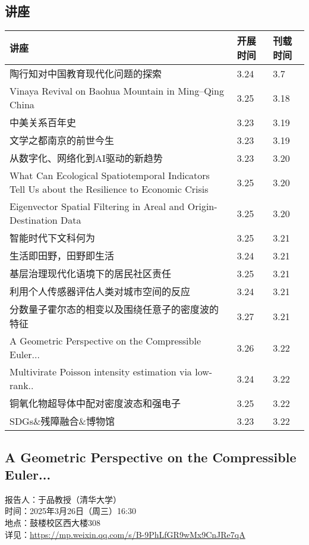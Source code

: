 \documentclass[letterpaper, 12pt]{article}
\begin{document}
\begin{multicols}{2}
\pagebreak

\section{讲座}
\begin{tabular}{|>{\centering\arraybackslash}m{}|m{}|m{}|}
    \hline
    讲座 & 开展时间 & 刊载时间\\
    \hline\hline
    陶行知对中国教育现代化问题的探索 & 3.24 & 3.7\\\hline
    Vinaya Revival on Baohua Mountain in Ming–Qing China & 3.25 & 3.18 \\\hline
    中美关系百年史 & 3.23 & 3.19\\\hline
    文学之都南京的前世今生 & 3.23 & 3.19\\\hline
    从数字化、网络化到AI驱动的新趋势 & 3.23 & 3.20\\\hline
    What Can Ecological Spatiotemporal Indicators Tell Us about the Resilience to Economic Crisis & 3.25 & 3.20\\\hline
    Eigenvector Spatial Filtering in Areal and Origin-Destination Data & 3.25 & 3.20\\\hline
    智能时代下文科何为 & 3.25 & 3.21\\\hline
    生活即田野，田野即生活 & 3.24 & 3.21\\\hline
    基层治理现代化语境下的居民社区责任 & 3.25 & 3.21\\\hline
    利用个人传感器评估人类对城市空间的反应 & 3.24 & 3.21\\\hline
    分数量子霍尔态的相变以及围绕任意子的密度波的特征 & 3.27 & 3.21\\\hline
    A Geometric Perspective on the Compressible Euler... & 3.26 & 3.22\\\hline
    Multivirate Poisson intensity estimation via low-rank.. & 3.24 & 3.22\\\hline
    铜氧化物超导体中配对密度波态和强电子 & 3.25 & 3.22\\\hline
    SDGs\&残障融合\&博物馆 & 3.23 & 3.22\\\hline
\end{tabular}
\subsection{A Geometric Perspective on the Compressible Euler...}
报告人：于品教授（清华大学）
\\时间：2025年3月26日（周三）16:30
\\地点：鼓楼校区西大楼308
\\详见：\url{https://mp.weixin.qq.com/s/B-9PhLfGR9wMx9CnJRe7qA}


\end{multicols}
\end{document}
